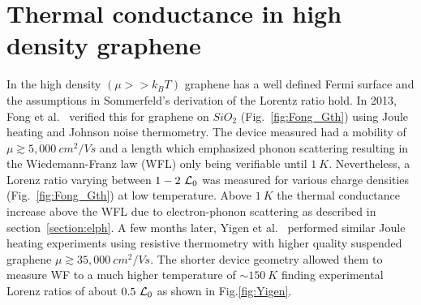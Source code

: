\chapter{Thermal conductance in high density graphene}
\label{ch:thermal_conductance_in_high_density_graphene}
In the high density $(\mu >> k_BT)$ graphene has a well defined Fermi surface and the assumptions in Sommerfeld's derivation of the Lorentz ratio hold. In 2013, Fong et al.~\cite{fong_measurement_2013} verified this for graphene on $SiO_2$ (Fig.~\ref{fig:Fong_Gth}) using Joule heating and Johnson noise thermometry. The device measured had a mobility of $\mu \gtrsim 5,000~cm^2/Vs$ and a length which emphasized phonon scattering resulting in the Wiedemann-Franz law (WFL) only being verifiable until $1~K$. Nevertheless, a Lorenz ratio varying between $1-2~\mathcal{L}_0$ was measured for various charge densities (Fig.~\ref{fig:Fong_Gth}) at low temperature. Above $1~K$ the thermal conductance increase above the WFL due to electron-phonon scattering as described in section~\ref{section:elph}. A few months later, Yigen et al.~\cite{yigen_wiedemannfranz_2014} performed similar Joule heating experiments using resistive thermometry with higher quality suspended graphene $\mu \gtrsim 35,000~cm^2/Vs$. The shorter device geometry allowed them to measure WF to a much higher temperature of ${\sim 150}~K$ finding experimental Lorenz ratios of about $0.5~\mathcal{L}_0$ as shown in Fig.\ref{fig:Yigen}.
